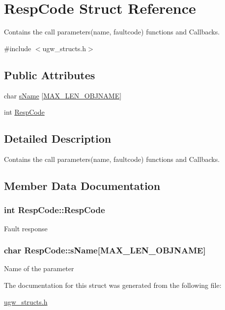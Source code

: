 \hypertarget{structRespCode}{\section{Resp\-Code Struct Reference}
\label{structRespCode}
}


Contains the call parameters(name, faultcode) functions and Callbacks.  




{\ttfamily \#include $<$ugw\-\_\-structs.\-h$>$}

\subsection*{Public Attributes}
\begin{DoxyCompactItemize}
\item 
char \hyperlink{structRespCode_aea2e71950b13707509aab2dd03625dd6}{s\-Name} \mbox{[}\hyperlink{group__LIBHELP_ga635a84c0e3ae6e922f824064a006500d}{M\-A\-X\-\_\-\-L\-E\-N\-\_\-\-O\-B\-J\-N\-A\-M\-E}\mbox{]}
\item 
int \hyperlink{structRespCode_a0bcc90ea9ac8680b6c9ba98644e70f1f}{Resp\-Code}
\end{DoxyCompactItemize}


\subsection{Detailed Description}
Contains the call parameters(name, faultcode) functions and Callbacks. 

\subsection{Member Data Documentation}
\hypertarget{structRespCode_a0bcc90ea9ac8680b6c9ba98644e70f1f}{
\subsubsection[{Resp\-Code}]{\setlength{\rightskip}{0pt plus 5cm}int Resp\-Code\-::\-Resp\-Code}}\label{structRespCode_a0bcc90ea9ac8680b6c9ba98644e70f1f}
Fault response \hypertarget{structRespCode_aea2e71950b13707509aab2dd03625dd6}{
\subsubsection[{s\-Name}]{\setlength{\rightskip}{0pt plus 5cm}char Resp\-Code\-::s\-Name\mbox{[}{\bf M\-A\-X\-\_\-\-L\-E\-N\-\_\-\-O\-B\-J\-N\-A\-M\-E}\mbox{]}}}\label{structRespCode_aea2e71950b13707509aab2dd03625dd6}
Name of the parameter 

The documentation for this struct was generated from the following file\-:\begin{DoxyCompactItemize}
\item 
\hyperlink{ugw__structs_8h}{ugw\-\_\-structs.\-h}\end{DoxyCompactItemize}
